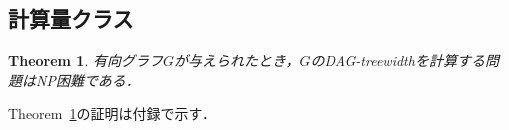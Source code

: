 \documentclass[master]{kuisthesis}		%
\theoremstyle{plain}
\newtheorem{theorem}{Theorem}
\newtheorem{lemma}{Lemma}
\theoremstyle{definition}
\begin{document}
\subsection{計算量クラス}

\begin{theorem}\label{NP困難}
    有向グラフ$G$が与えられたとき，$G$のDAG-treewidthを計算する問題はNP困難である．
\end{theorem}

Theorem~\ref{NP困難}の証明は付録で示す．

\end{document}
